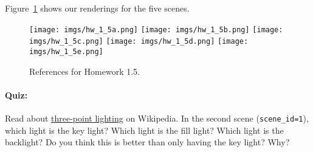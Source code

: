 Figure~\ref{fig:hw_1_5} shows our renderings for the five scenes.

\begin{figure}[ht]
    \centering
    \texttt{[image: imgs/hw\_1\_5a.png]}
    \texttt{[image: imgs/hw\_1\_5b.png]}
    \texttt{[image: imgs/hw\_1\_5c.png]}
    \texttt{[image: imgs/hw\_1\_5d.png]}
    \texttt{[image: imgs/hw\_1\_5e.png]}
    \caption{References for Homework 1.5.}
    \label{fig:hw_1_5}
\end{figure}

\paragraph{Quiz:} Read about \href{https://en.wikipedia.org/wiki/Three-point_lighting}{three-point lighting} on Wikipedia. In the second scene (\lstinline{scene_id=1}), which light is the key light? Which light is the fill light? Which light is the backlight? Do you think this is better than only having the key light? Why?

%
%


